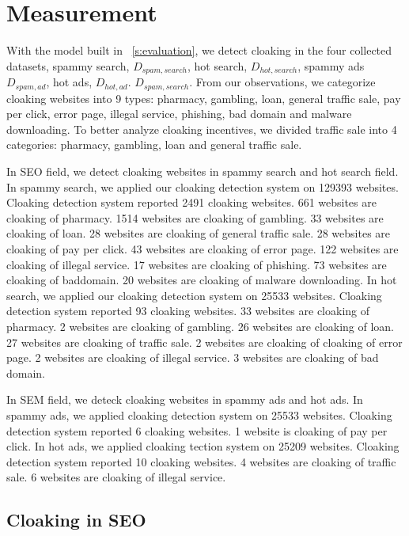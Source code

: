 \section{Measurement}
\label{s:measurement}


With the model built in ~\autoref{s:evaluation}, we detect cloaking in
the four collected datasets, spammy search, $D_{spam, search}$, hot search,
$D_{hot, search}$, spammy ads $D_{spam, ad}$, hot ads, $D_{hot, ad}$. 
$D_{spam, search}$. From our observations, we categorize cloaking websites into 9 types:
pharmacy, gambling, loan, general traffic sale, pay per click, error page, illegal service,
phishing, bad domain and malware downloading. To better analyze cloaking incentives, 
we divided traffic sale into 4 categories: pharmacy, gambling, loan and general traffic sale. 


In SEO field, we detect cloaking websites in spammy search and hot search field. In spammy search,
we applied our cloaking detection system on 129393 websites. Cloaking detection system reported 2491
cloaking websites. 661 websites are cloaking of pharmacy. 1514 websites are cloaking of gambling.
33 websites are cloaking of loan. 28 websites are cloaking of general traffic sale. 28 websites are cloaking
of pay per click. 43 websites are cloaking of error page. 122 websites are cloaking of illegal service. 
17 websites are cloaking of phishing. 73 websites are cloaking of baddomain. 20 websites are cloaking of malware downloading.
In hot search, we applied our cloaking detection system on 25533 websites. Cloaking detection system reported 93
cloaking websites. 33 websites are cloaking of pharmacy. 2 websites are cloaking of gambling.
26 websites are cloaking of loan. 27 websites are cloaking of traffic sale. 2 websites are cloaking of cloaking of
error page. 2 websites are cloaking of illegal service. 3 websites are cloaking of bad domain. 

In SEM field, we deteck cloaking websites in spammy ads and hot ads. In spammy ads,
we applied cloaking detection system on 25533 websites. Cloaking detection system reported 6 cloaking websites.
1 website is cloaking of pay per click. In hot ads, we applied cloaking tection system on 25209 websites.
Cloaking detection system reported 10 cloaking websites. 4 websites are cloaking of traffic sale.
6 websites are cloaking of illegal service. 



\subsection{Cloaking in SEO}

